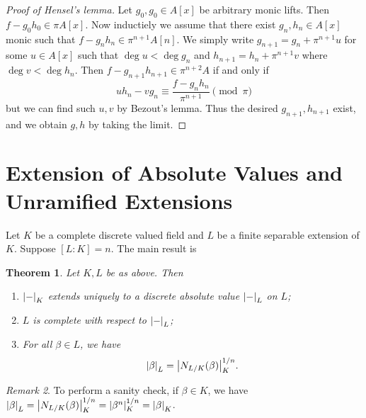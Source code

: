 \documentclass[leqno, openany]{memoir}
\newtheorem{thm}{Theorem}[section]
\theoremstyle{definition}
\theoremstyle{remark}
\newtheorem{rmk}[thm]{Remark}
\theoremstyle{plain}
\theoremstyle{definition}
\theoremstyle{remark}
\begin{document}
\begin{proof}[Proof of Hensel's lemma]
    Let $g_0, g_0 \in A[x]$ be arbitrary monic lifts. Then $f - g_0 h_0 \in \pi A[x]$. Now inductiely we assume that there exist $g_n, h_n \in A[x]$ monic such that $f - g_n h_n \in \pi^{n+1} A[n]$. We simply write $g_{n+1} = g_n + \pi^{n+1} u$ for some $u \in A[x]$ such that $\deg u < \deg g_n$ and $h_{n+1} = h_n + \pi^{n+1} v$ where $\deg v < \deg h_n$. Then $f - g_{n+1} h_{n+1} \in \pi^{n+2} A$ if and only if 
    \[ u h_n - v g_n \equiv \frac{f - g_n h_n}{\pi^{n+1}} \pmod \pi \]
    but we can find such $u,v$ by Bezout's lemma. Thus the desired $g_{n+1}, h_{n+1}$ exist, and we obtain $g,h$ by taking the limit.
\end{proof}

\section{Extension of Absolute Values and Unramified Extensions}%
\label{sec:extension_of_absolute_values_and_unramified_extensions}

Let $K$ be a complete discrete valued field and $L$ be a finite separable extension of $K$. Suppose $[L:K] = n$. The main result is

\begin{thm}
    Let $K,L$ be as above. Then
    \begin{enumerate}
        \item $\abs{-}_K$ extends uniquely to a discrete absolute value $\abs{-}_L$ on $L$;
        \item $L$ is complete with respect to $\abs{-}_L$;
        \item For all $\beta \in L$, we have 
            \[ \abs{\beta}_L = \abs{N_{L/K}(\beta)}_K^{1/n}. \]
    \end{enumerate}
\end{thm}

\begin{rmk}
    To perform a sanity check, if $\beta \in K$, we have $\abs{\beta}_L = \abs{N_{L/K}(\beta)}_K^{1/n} = \abs{\beta^n}_K^{1/n} = \abs{\beta}_K$.
\end{rmk}
\end{document}
